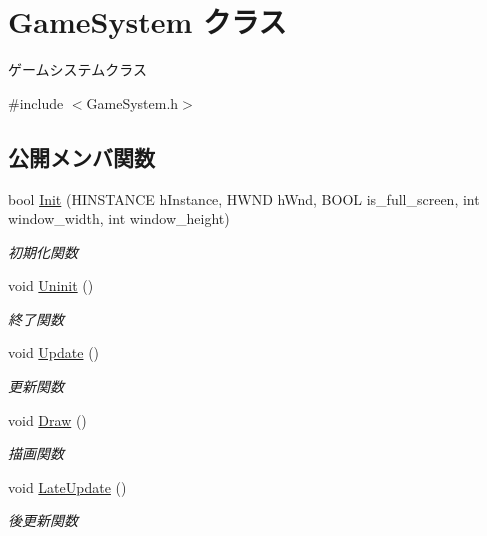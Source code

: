 \hypertarget{class_game_system}{}\section{Game\+System クラス}
\label{class_game_system}


ゲームシステムクラス  




{\ttfamily \#include $<$Game\+System.\+h$>$}

\subsection*{公開メンバ関数}
\begin{DoxyCompactItemize}
\item 
bool \mbox{\hyperlink{class_game_system_ad4c08500b98490e00ce87a770bb5e981}{Init}} (H\+I\+N\+S\+T\+A\+N\+CE h\+Instance, H\+W\+ND h\+Wnd, B\+O\+OL is\+\_\+full\+\_\+screen, int window\+\_\+width, int window\+\_\+height)
\begin{DoxyCompactList}\small\item\em 初期化関数 \end{DoxyCompactList}\item 
void \mbox{\hyperlink{class_game_system_af76866bd03b84dca6880f1493fd3c9d1}{Uninit}} ()
\begin{DoxyCompactList}\small\item\em 終了関数 \end{DoxyCompactList}\item 
void \mbox{\hyperlink{class_game_system_ab0add1f2bd97d3b125a5682f571053a3}{Update}} ()
\begin{DoxyCompactList}\small\item\em 更新関数 \end{DoxyCompactList}\item 
void \mbox{\hyperlink{class_game_system_a474db0066b23d39e94e0a830140edce5}{Draw}} ()
\begin{DoxyCompactList}\small\item\em 描画関数 \end{DoxyCompactList}\item 
void \mbox{\hyperlink{class_game_system_aa416827abc995e1b8df4a5cf87911baf}{Late\+Update}} ()
\begin{DoxyCompactList}\small\item\em 後更新関数 \end{DoxyCompactList}\end{DoxyCompactItemize}


